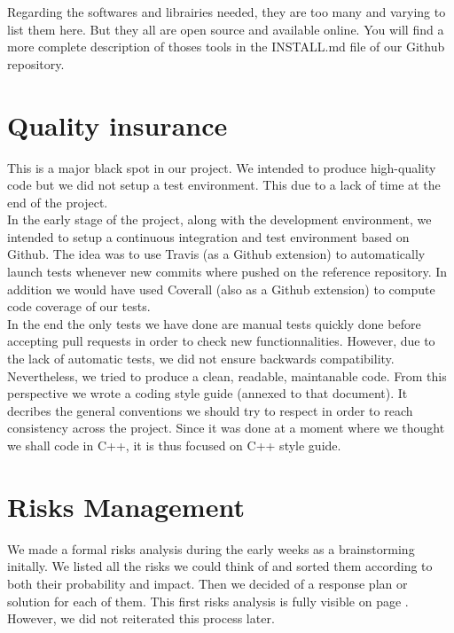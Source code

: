 \noindent
Regarding the softwares and librairies needed,
they are too many and varying to list them here.
But they all are open source and available online.
You will find a more complete description of thoses
tools in the INSTALL.md file of our Github repository.

\section{Quality insurance}
This is a major black spot in our project.
We intended to produce high-quality code but we did not
setup a test environment. This due to a lack of time
at the end of the project.\\

\noindent
In the early stage of the project, along with the development environment,
we intended to setup a continuous integration and test environment based
on Github.
The idea was to use Travis (as a Github extension) to automatically launch
tests whenever new commits where pushed on the reference repository.
In addition we would have used Coverall (also as a Github extension)
to compute code coverage of our tests.\\

\noindent
In the end the only tests we have done are manual tests
quickly done before accepting pull requests in order to check
new functionnalities.
However, due to the lack of automatic tests, we did not ensure
backwards compatibility.\\

\noindent
Nevertheless, we tried to produce a clean, readable, maintanable code.
From this perspective we wrote a coding style guide (annexed to that document).
It decribes the general conventions we should try to respect in order to
reach consistency across the project.
Since it was done at a moment where we thought we shall code in C++,
it is thus focused on C++ style guide.

\section{Risks Management}
We made a formal risks analysis during the early weeks as a
brainstorming initally. We listed all the risks we could think of and
sorted them according to both their probability and impact. Then we
decided of a response plan or solution for each of them. This first
risks analysis is fully visible on page \pageref{fig:risks}. However,
we did not reiterated this process later. 

